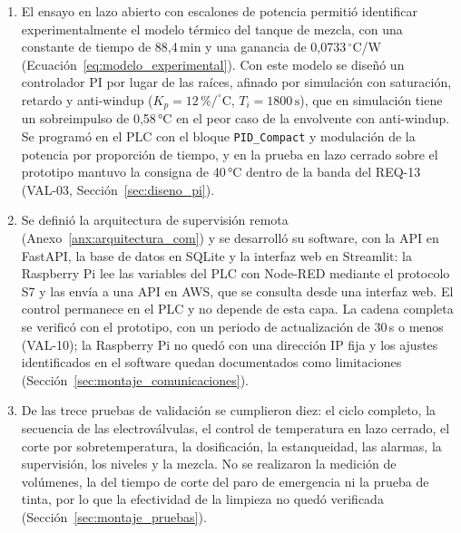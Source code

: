 \begin{enumerate}
\item El ensayo en lazo abierto con escalones de potencia permitió identificar experimentalmente el modelo térmico del tanque de mezcla, con una constante de tiempo de 88,4\,min y una ganancia de 0,0733\,$^{\circ}$C/W (Ecuación~\eqref{eq:modelo_experimental}). Con este modelo se diseñó un controlador PI por lugar de las raíces, afinado por simulación con saturación, retardo y anti-windup ($K_p = 12\,\%/^{\circ}\mathrm{C}$, $T_i = 1800\,\mathrm{s}$), que en simulación tiene un sobreimpulso de 0,58\,°C en el peor caso de la envolvente con anti-windup. Se programó en el PLC con el bloque \texttt{PID\_Compact} y modulación de la potencia por proporción de tiempo, y en la prueba en lazo cerrado sobre el prototipo mantuvo la consigna de 40\,°C dentro de la banda del REQ-13 (VAL-03, Sección~\ref{sec:diseno_pi}).

\item Se definió la arquitectura de supervisión remota (Anexo~\ref{anx:arquitectura_com}) y se desarrolló su software, con la API en FastAPI, la base de datos en SQLite y la interfaz web en Streamlit: la Raspberry Pi lee las variables del PLC con Node-RED mediante el protocolo S7 y las envía a una API en AWS, que se consulta desde una interfaz web. El control permanece en el PLC y no depende de esta capa. La cadena completa se verificó con el prototipo, con un periodo de actualización de 30\,s o menos (VAL-10); la Raspberry Pi no quedó con una dirección IP fija y los ajustes identificados en el software quedan documentados como limitaciones (Sección~\ref{sec:montaje_comunicaciones}).

\item De las trece pruebas de validación se cumplieron diez: el ciclo completo, la secuencia de las electroválvulas, el control de temperatura en lazo cerrado, el corte por sobretemperatura, la dosificación, la estanqueidad, las alarmas, la supervisión, los niveles y la mezcla. No se realizaron la medición de volúmenes, la del tiempo de corte del paro de emergencia ni la prueba de tinta, por lo que la efectividad de la limpieza no quedó verificada (Sección~\ref{sec:montaje_pruebas}).

\end{enumerate}

